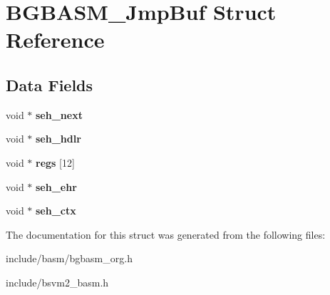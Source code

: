 \hypertarget{structBGBASM__JmpBuf}{\section{B\-G\-B\-A\-S\-M\-\_\-\-Jmp\-Buf Struct Reference}
\label{structBGBASM__JmpBuf}
}
\subsection*{Data Fields}
\begin{DoxyCompactItemize}
\item 
\hypertarget{structBGBASM__JmpBuf_adaf251d1b454a54273295ae682e053eb}{void $\ast$ {\bfseries seh\-\_\-next}}\label{structBGBASM__JmpBuf_adaf251d1b454a54273295ae682e053eb}

\item 
\hypertarget{structBGBASM__JmpBuf_a6e8f0119153dad3f38544be3cbc85c5d}{void $\ast$ {\bfseries seh\-\_\-hdlr}}\label{structBGBASM__JmpBuf_a6e8f0119153dad3f38544be3cbc85c5d}

\item 
\hypertarget{structBGBASM__JmpBuf_a2943541fff75e316b5538319eaf0a7cd}{void $\ast$ {\bfseries regs} \mbox{[}12\mbox{]}}\label{structBGBASM__JmpBuf_a2943541fff75e316b5538319eaf0a7cd}

\item 
\hypertarget{structBGBASM__JmpBuf_a2eed988b930285e442210544f48c43ed}{void $\ast$ {\bfseries seh\-\_\-ehr}}\label{structBGBASM__JmpBuf_a2eed988b930285e442210544f48c43ed}

\item 
\hypertarget{structBGBASM__JmpBuf_a643d0cca00801d3c083bf9292d95874d}{void $\ast$ {\bfseries seh\-\_\-ctx}}\label{structBGBASM__JmpBuf_a643d0cca00801d3c083bf9292d95874d}

\end{DoxyCompactItemize}


The documentation for this struct was generated from the following files\-:\begin{DoxyCompactItemize}
\item 
include/basm/bgbasm\-\_\-org.\-h\item 
include/bsvm2\-\_\-basm.\-h\end{DoxyCompactItemize}
